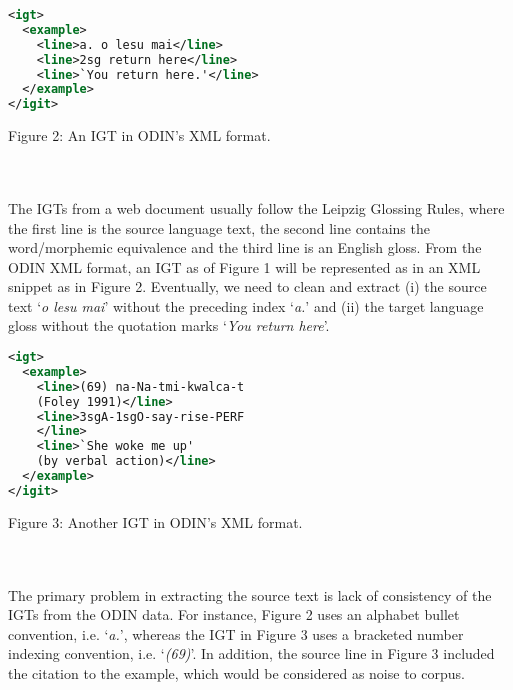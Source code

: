 \documentclass[11pt]{article}
\begin{document}
\begin{minipage}{\columnwidth}
\begin{lstlisting}[language=XML]
<igt>
  <example>
    <line>a. o lesu mai</line>
    <line>2sg return here</line>
    <line>`You return here.'</line>
  </example>
</igit>
\end{lstlisting} 
\centerline{Figure 2: An IGT in ODIN's XML format.}
\end{minipage}
\\ \\
\noindent The IGTs from a web document usually follow the Leipzig Glossing Rules, where the first line is the source language text, the second line contains the word/morphemic equivalence and the third line is an English gloss. From the ODIN XML format, an IGT as of Figure 1 will be represented as in an XML snippet as in Figure 2. Eventually, we need to clean and extract (i) the source text `\emph{o lesu mai}' without the preceding index `\emph{a.}' and (ii) the target language gloss without the quotation marks `\emph{You return here}'.
\begin{minipage}{\columnwidth}
\begin{lstlisting}[language=XML]
<igt>
  <example>
    <line>(69) na-Na-tmi-kwalca-t 
    (Foley 1991)</line>
    <line>3sgA-1sgO-say-rise-PERF
    </line>
    <line>`She woke me up' 
    (by verbal action)</line>
  </example>
</igit>
\end{lstlisting} 
\smallskip
\centerline{Figure 3: Another IGT in ODIN's XML format.}
\end{minipage}
\\ \\
\noindent The primary problem in extracting the source text is lack of consistency of the IGTs from the ODIN data. For instance, Figure 2 uses an alphabet bullet convention, i.e. `\emph{a.}', whereas the IGT in Figure 3 uses a bracketed number indexing convention, i.e. `\emph{(69)}'. In addition, the source line in Figure 3 included the citation to the example, which would be considered as noise to corpus.
\end{document}
